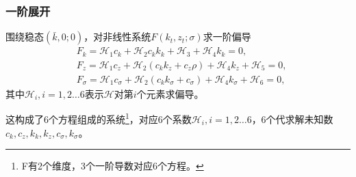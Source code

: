 \subsubsection{一阶展开}
围绕稳态$(\bar{k},0;0)$，对非线性系统$F(k_t,z_t;\sigma)$求一阶偏导
\begin{equation*}
  \begin{split}
    &F_k = \mathcal{H}_1 c_k + \mathcal{H}_2 c_k k_k + \mathcal{H}_3 + \mathcal{H}_4 k_k = 0,\\
    &F_z = \mathcal{H}_1 c_z + \mathcal{H}_2 \left( c_k k_z + c_z \rho \right) + \mathcal{H}_4 k_z + \mathcal{H}_5 = 0,\\
    &F_{\sigma} = \mathcal{H}_1 c_{\sigma} + \mathcal{H}_2 \left( c_k k_{\sigma} + c_{\sigma}  \right) + \mathcal{H}_4 k_{\sigma} + \mathcal{H}_6 = 0,
  \end{split}
\end{equation*}
其中$\mathcal{H}_{i},i=1,2 \ldots 6$表示$\mathcal{H}$对第$i$个元素求偏导。

这构成了6个方程组成的系统\footnote{F有2个维度，3个一阶导数对应6个方程。}，对应6个系数$\mathcal{H}_{i}, i=1,2 \ldots 6$，6个代求解未知数$c_{k},c_z,k_k,k_z,c_{\sigma},k_{\sigma}$。

